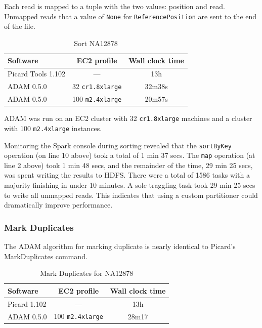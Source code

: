 \documentclass[10pt,twocolumn]{article}
\theoremstyle{plain}
\begin{document}
Each read is mapped to a tuple with the two values: position and read.
Unmapped reads that a value of \texttt{None} for \texttt{ReferencePosition}
are sent to the end of the file.

\begin{table}[h]
\caption{Sort NA12878}
\label{tab:time-flagstat}
\begin{scriptsize}
\begin{center}
\begin{tabular}{| l | c | c |}
\hline
\bf Software & \bf EC2 profile & \bf Wall clock time \\
\hline
Picard Tools 1.102 & --- & 13h \\
ADAM 0.5.0 & 32 \texttt{cr1.8xlarge} & 32m38s \\
ADAM 0.5.0 & 100 \texttt{m2.4xlarge} & 20m57s \\ 
\hline
\end{tabular}
\end{center}
\end{scriptsize}
\end{table}

ADAM was run on an EC2 cluster with 32 \texttt{cr1.8xlarge} machines and
a cluster with 100 \texttt{m2.4xlarge} instances.

Monitoring the Spark console during sorting revealed that the \texttt{sortByKey}
operation (on line 10 above) took a total of 1 min 37 secs. The \texttt{map} operation
(at line 2 above) took 1 min 48 secs, and the remainder of the time, 29 min 25 secs, was 
spent writing the results to HDFS. There were a total of 1586 tasks with a majority
finishing in under 10 minutes. A sole traggling task took 29 min 25 secs to write
all unmapped reads. This indicates that using a custom partitioner could dramatically
improve performance.

\subsubsection{Mark Duplicates}
\label{sec:mark-duplicates}

The ADAM algorithm for marking duplicate is nearly identical to Picard's MarkDuplicates
command. 

\begin{table}[h]
\caption{Mark Duplicates for NA12878}
\label{tab:time-mark-duplicates}
\begin{scriptsize}
\begin{center}
\begin{tabular}{| l | c | c |}
\hline
\bf Software & \bf EC2 profile & \bf Wall clock time \\
\hline
Picard 1.102 & --- & 13h \\
ADAM 0.5.0 & 100 \texttt{m2.4xlarge} & 28m17 \\
\hline
\end{tabular}
\end{center}
\end{scriptsize}
\end{table}
\end{document}
